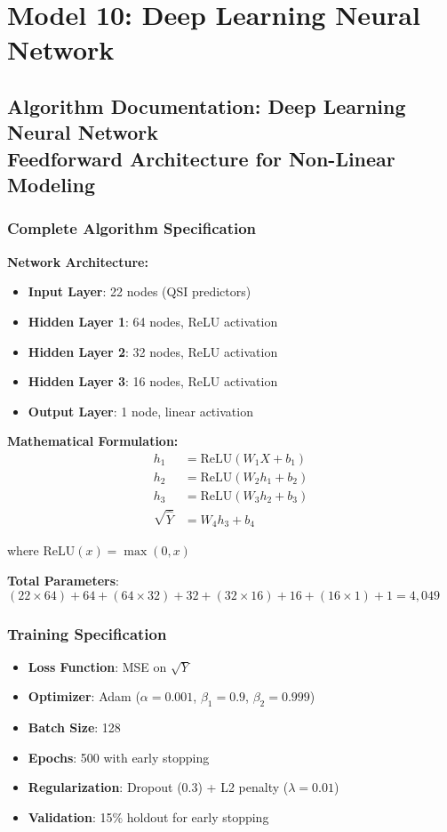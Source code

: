 \chapter{Model 10: Deep Learning Neural Network}\newpage

\section{Algorithm Documentation: Deep Learning Neural Network\\Feedforward Architecture for Non-Linear Modeling}

\subsection{Complete Algorithm Specification}

\textbf{Network Architecture:}
\begin{itemize}
    \item \textbf{Input Layer}: 22 nodes (QSI predictors)
    \item \textbf{Hidden Layer 1}: 64 nodes, ReLU activation
    \item \textbf{Hidden Layer 2}: 32 nodes, ReLU activation
    \item \textbf{Hidden Layer 3}: 16 nodes, ReLU activation
    \item \textbf{Output Layer}: 1 node, linear activation
\end{itemize}

\textbf{Mathematical Formulation:}
\begin{align}
h_1 &= \text{ReLU}(W_1 X + b_1) \\
h_2 &= \text{ReLU}(W_2 h_1 + b_2) \\
h_3 &= \text{ReLU}(W_3 h_2 + b_3) \\
\sqrt{\hat{Y}} &= W_4 h_3 + b_4
\end{align}

where ReLU$(x) = \max(0, x)$

\textbf{Total Parameters}: $(22 \times 64) + 64 + (64 \times 32) + 32 + (32 \times 16) + 16 + (16 \times 1) + 1 = 4,049$

\subsection{Training Specification}

\begin{itemize}
    \item \textbf{Loss Function}: MSE on $\sqrt{Y}$
    \item \textbf{Optimizer}: Adam ($\alpha=0.001$, $\beta_1=0.9$, $\beta_2=0.999$)
    \item \textbf{Batch Size}: 128
    \item \textbf{Epochs}: 500 with early stopping
    \item \textbf{Regularization}: Dropout (0.3) + L2 penalty ($\lambda=0.01$)
    \item \textbf{Validation}: 15\% holdout for early stopping
\end{itemize}

